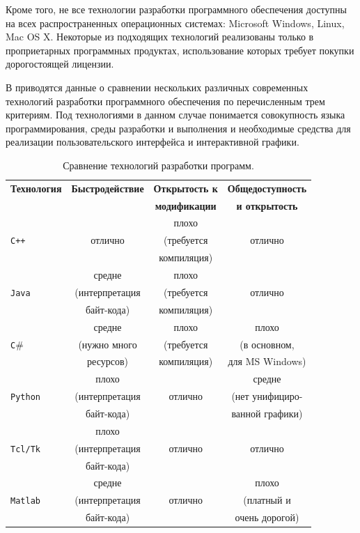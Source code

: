 Кроме того, не все технологии разработки программного обеспечения
доступны на всех распространенных операционных системах: Microsoft
Windows, Linux, Mac OS X.  Некоторые из подходящих технологий
реализованы только в проприетарных программных продуктах,
использование которых требует покупки дорогостоящей лицензии.

В  приводятся данные о сравнении нескольких
различных современных технологий разработки программного обеспечения
по перечисленным трем критериям.  Под технологиями в данном случае
понимается совокупность языка программирования, среды разработки и
выполнения и необходимые средства для реализации пользовательского
интерфейса и интерактивной графики.

\begin{table}[ht]
\centering
\caption{Сравнение технологий разработки программ.}
\label{tabl:sdk_tech}
\begin{tabular}{|l|c|c|c|}
\hline
\bf Технология & \bf Быстродействие & \bf Открытость к & \bf Общедоступность \\
             &                & \bf модификации  & \bf и открытость \\
\hline
             &                &  плохо       &              \\
\tt C++      &   отлично      & (требуется   & отлично      \\
             &                & компиляция)  &              \\
\hline
             &   средне       &  плохо       &              \\
\tt Java     & (интерпретация & (требуется   & отлично      \\
             & байт-кода)     & компиляция)  &              \\
\hline
             &   средне       &  плохо       & плохо        \\
\tt C$\#$    & (нужно много   & (требуется   & (в основном, \\
             & ресурсов)      & компиляция)  & для MS Windows) \\
\hline
            &   плохо        &              & средне       \\
\tt Python  & (интерпретация & отлично      & (нет унифициро- \\
            & байт-кода)     &              & ванной графики) \\
\hline
           &   плохо        &              &              \\
\tt Tcl/Tk & (интерпретация & отлично      & отлично      \\
           & байт-кода)     &              &              \\
\hline
           &   средне       &              & плохо        \\
\tt Matlab & (интерпретация & отлично      & (платный и   \\
           & байт-кода)     &              & очень дорогой) \\
\hline
\end{tabular}
\end{table}

